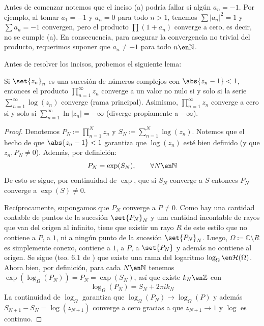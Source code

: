 \begin{sol}
Antes de comenzar notemos que el inciso (a) podría fallar si algún $a_n = -1$. Por ejemplo, al tomar $a_1=-1$ y $a_n=0$ para todo $n>1$, tenemos $\sum |a_n|^2 = 1$ y $\sum a_n = -1$ convergen, pero el producto $\prod(1+a_n)$ converge a cero, es decir, no se cumple (a). En consecuencia, para asegurar la convergencia no trivial del producto, requerimos suponer que $a_n \neq -1$ para todo $n\en\mathbb N$. \par
Antes de resolver los incisos, probemos el siguiente lema:
\begin{lema}\label{lema:convprod}
Si $\set{z_n}_n$ es una sucesión de números complejos con $\abs{z_n-1} < 1$, entonces el producto $\prod^\infty_{n=1} z_n$ converge a un valor no nulo si y solo si la serie $\sum^\infty_{n=1}\log(z_n)$ converge (rama principal). Asimismo, $\prod^\infty_{n=1}z_n$ converge a cero si y solo si $\sum^\infty_{n=1}\ln{|z_n|} = -\infty$ (diverge propiamente a $-\infty$).
\begin{proof}
Denotemos $P_N \coloneq \prod^N_{n=1}z_n$ y $S_N\coloneq\sum^N_{n=1}\log(z_n)$.
Notemos que el hecho de que $\abs{z_n-1} < 1$ garantiza que $\log(z_n)$ esté bien definido (y que $z_n,P_N \neq 0$). Además, por definición:
\[
P_N = \exp(S_N),
\qquad\forall N\en\mathbb N
\]
De esto se sigue, por continuidad de $\exp$, que si $S_N$ converge a $S$ entonces $P_N$ converge a $\exp(S) \neq 0$.\par
Recíprocamente, supongamos que $P_N$ converge a $P\neq 0$. Como hay una cantidad contable de puntos de la sucesión $\set{P_N}_N$ y una cantidad incontable de rayos que van del origen al infinito, tiene que existir un rayo $R$ de este estilo que no contiene a $P$, a $1$, ni a ningún punto de la sucesión $\set{P_N}_N$. Luego, $\Omega \coloneq \mathbb{C} \setminus R$ es simplemente conexo, contiene a $1$, a $P$, a $\set{P_N}$ y además no contiene al origen. Se sigue (teo. 6.1 de \cite[\S 3.6]{stein}) que existe una rama del logaritmo $\log_\Omega \en \mathcal{H}(\Omega)$. Ahora bien, por definición, para cada $N\en\mathbb N$ tenemos $\exp(\log_\Omega(P_N)) = P_N = \exp(S_N)$, así que existe $k_N\en\mathbb Z$ con
\begin{equation}\label{eq:logprod}
\log_\Omega(P_N) = S_N + 2\pi ik_N
\end{equation}
La continuidad de $\log_\Omega$ garantiza que $\log_\Omega(P_N) \to \log_\Omega(P)$ y además $S_{N+1} - S_N = \log(z_{N+1})$ converge a cero gracias a que $z_{N+1} \to 1$ y $\log$ es continuo.%

\end{proof}
\end{lema}
\end{sol}
